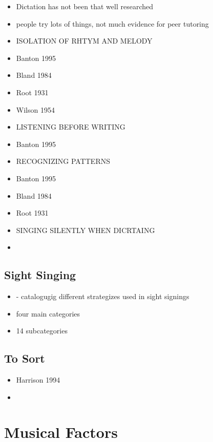 \documentclass[]{book}
\providecommand{\tightlist}{%
  \setlength{\itemsep}{0pt}\setlength{\parskip}{0pt}}
\theoremstyle{definition}
\theoremstyle{definition}
\theoremstyle{definition}
\theoremstyle{remark}
\begin{document}
\begin{itemize}
\tightlist
\item
  Dictation has not been that well researched
  \citep{furbyEffectsPeerTutoring2016}
\item
  people try lots of things, not much evidence for peer tutoring
  \citep{furbyEffectsPeerTutoring2016}
\item
  ISOLATION OF RHTYM AND MELODY
\item
  Banton 1995
\item
  Bland 1984
\item
  Root 1931
\item
  Wilson 1954
\item
  LISTENING BEFORE WRITING
\item
  Banton 1995
\item
  RECOGNIZING PATTERNS
\item
  Banton 1995
\item
  Bland 1984
\item
  Root 1931
\item
  SINGING SILENTLY WHEN DICRTAING
\item
  \citep{klonoskiImprovingDictationAuralSkills2006}
\end{itemize}

\hypertarget{sight-singing}{%
\subsection{Sight Singing}\label{sight-singing}}

\begin{itemize}
\tightlist
\item
  \citep{fournierCognitiveStrategiesSightsinging2017a} - catalogugig
  different strategizes used in sight signings
\item
  four main categories
\item
  14 subcategories
\end{itemize}

\hypertarget{to-sort}{%
\subsection{To Sort}\label{to-sort}}

\begin{itemize}
\item
  Harrison 1994
\item
\end{itemize}

\hypertarget{musical-factors}{%
\section{Musical Factors}\label{musical-factors}}
\end{document}
